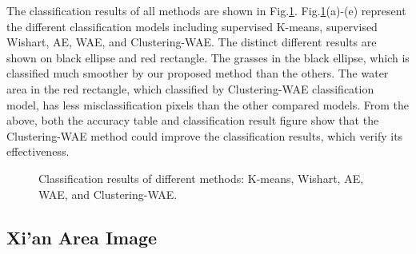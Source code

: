 \documentclass[11pt, a4paper, onecolumn, oneside]{article}
\begin{document}
The classification results of all methods are shown in Fig.\ref{fig:five}. Fig.\ref{fig:five}(a)-(e) represent the different classification models including supervised K-means, supervised Wishart, AE, WAE, and Clustering-WAE. The distinct different results are shown on black ellipse and red rectangle. The grasses in the black ellipse, which is classified much smoother by our proposed method than the others. The water area in the red rectangle, which classified by Clustering-WAE classification model, has less misclassification pixels than the other compared models. From the above, both the accuracy table and classification result figure show that the Clustering-WAE method could improve the classification results, which verify its effectiveness.

\begin{figure}
\caption{Classification results of different methods: K-means, Wishart, AE, WAE, and Clustering-WAE.}
\label{fig:five}
\end{figure}

\subsection{Xi’an Area Image}
\end{document}
